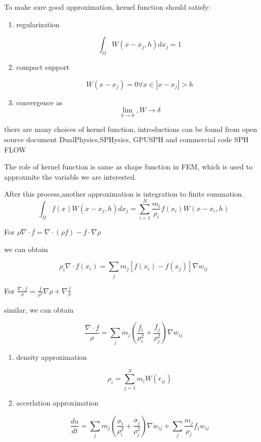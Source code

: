 \documentclass[11pt]{article}
\begin{document}
To make sure good approximation, kernel function should satisfy:

\begin{enumerate}
\item {regularization}

 $$ \int_{\Omega} W(x-x_j,h) dx_j = 1 $$

\item {compact support}

  $$  W(x-x_j) = 0  \forall x \in |x-x_j| > h $$

\item{convergence}
  as $$ \lim_{h \to 0}, W \to \delta $$
  
\end{enumerate}

there are many choices of kernel function, introductions can be found from open source document DualPhysics,SPHysics, GPUSPH and commercial code SPH FLOW

The role of kernel function is same as shape function in FEM, which is used to approxmite the variabls we are interested.  

After this process,another approximation is integration to finite summation. 
  $$ \int_{\Omega} f(x) W(x-x_j,h) dx_j = \sum_{i=1}^{N} \frac{m_i}{\rho_i} f(x_i) W(x-x_i,h) $$

For $ \rho \nabla \cdot f = \nabla \cdot (\rho f) - f \cdot \nabla \rho $

we can obtain

$$ \rho_i \nabla \cdot f(x_i) = \sum_j m_j[f(x_i) - f(x_j)] \nabla w_{ij} $$

For $ \frac{\nabla \cdot f}{\rho} = \frac{f}{\rho ^2} \nabla \rho + \nabla \frac{f}{\rho} $

similar, we can obtain

$$ \frac{\nabla \cdot f}{\rho} = \sum_j m_j (\frac{f_i}{\rho_i^2} + \frac{f_j}{\rho_j^2}) \nabla {w_{ij}} $$

\begin{enumerate}
	\item {density approximation}

	$$ \rho_i = \sum_{j=1}^{N}m_i W(r_{ij}) $$

	\item {accerlation approximation}
	
	$$ \frac{du}{dt} = \sum_j m_j( \frac{\sigma_i}{\rho_i^2} + \frac{\sigma_j}{\rho_j^2}) \nabla w_{ij} + \sum_j \frac{m_j}{\rho_j} f_j w_{ij} $$
	
\end{enumerate}
\end{document}
